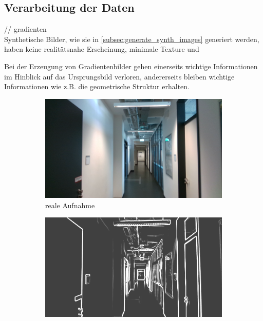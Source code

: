 
\subsection{Verarbeitung der Daten}
// gradienten\\

Synthetische Bilder, wie sie in  \ref{subsec:generate_synth_images} generiert werden, haben keine realitätsnahe Erscheinung, minimale Texture und 


Bei der Erzeugung von Gradientenbilder gehen einerseits wichtige Informationen im Hinblick auf das Ursprungsbild verloren, andererseits bleiben wichtige Informationen wie z.B. die geometrische Struktur erhalten.


\vspace{\fill}
\begin{figure}[htp]
	\centering
	\begin{subfigure}[b]{0.48\linewidth}
		\centering
		\includegraphics[width=\linewidth]{images/example/r000305.png}
		\caption{reale Aufnahme}
		\label{subfig:real}
	\end{subfigure}
	\hfill
	\begin{subfigure}[b]{0.48\linewidth}
		\centering
		\includegraphics[width=\linewidth]{images/example/rg000305.png}

\end{subfigure}
\end{figure}
